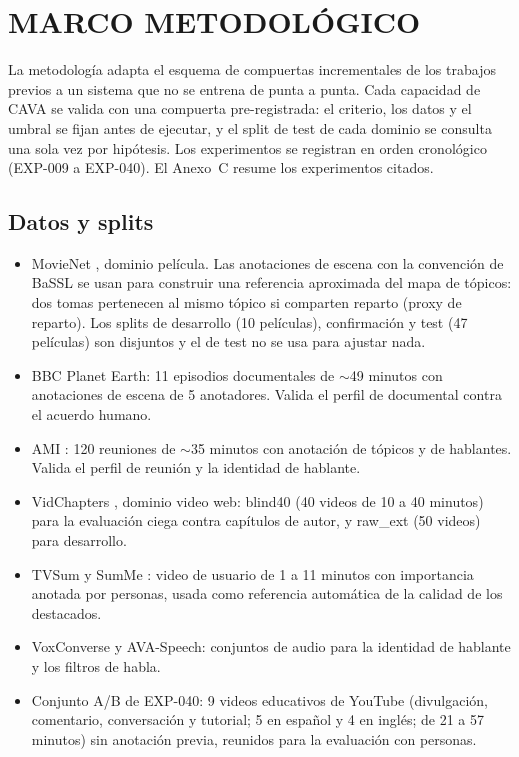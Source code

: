 \chapter{MARCO METODOLÓGICO}

La metodología adapta el esquema de compuertas incrementales de los trabajos previos a un
sistema que no se entrena de punta a punta. Cada capacidad de CAVA se valida con una
compuerta pre-registrada: el criterio, los datos y el umbral se fijan antes de ejecutar, y el
split de test de cada dominio se consulta una sola vez por hipótesis. Los experimentos
se registran en orden cronológico (EXP-009 a EXP-040). El Anexo~C resume los
experimentos citados.

\section{Datos y splits}

\begin{itemize}
  \item MovieNet \cite{huang2020movienet}, dominio película. Las anotaciones de escena con
        la convención de BaSSL \cite{mun2022bassl} se usan para construir una referencia
        aproximada del mapa de tópicos: dos tomas pertenecen al mismo tópico si comparten
        reparto (proxy de reparto). Los splits de desarrollo (10 películas), confirmación y
        test (47 películas) son disjuntos y el de test no se usa para ajustar nada.
  \item BBC Planet Earth: 11 episodios documentales de $\sim$49 minutos con anotaciones de
        escena de 5 anotadores. Valida el perfil de documental contra el acuerdo humano.
  \item AMI \cite{carletta2007ami}: 120 reuniones de $\sim$35 minutos con anotación de
        tópicos y de hablantes. Valida el perfil de reunión y la identidad de hablante.
  \item VidChapters \cite{ventura2024vidchapters}, dominio video web: blind40 (40 videos de
        10 a 40 minutos) para la evaluación ciega contra capítulos de autor, y raw\_ext (50
        videos) para desarrollo.
  \item TVSum \cite{song2015tvsum} y SumMe \cite{gygli2014summe}: video de usuario de 1 a 11
        minutos con importancia anotada por personas, usada como referencia automática de
        la calidad de los destacados.
  \item VoxConverse \cite{chung2020voxconverse} y AVA-Speech: conjuntos de audio para la
        identidad de hablante y los filtros de habla.
  \item Conjunto A/B de EXP-040: 9 videos educativos de YouTube (divulgación, comentario,
        conversación y tutorial; 5 en español y 4 en inglés; de 21 a 57 minutos) sin
        anotación previa, reunidos para la evaluación con personas.
\end{itemize}

